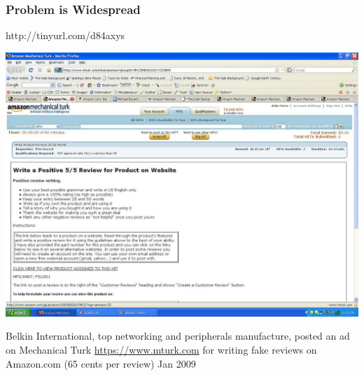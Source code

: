 \documentclass[t]{beamer}
\begin{document}
\begin{frame} \frametitle{Problem is Widespread} %

\begin{block}{http://tinyurl.com/d84axys}

\begin{center}
     \includegraphics[width=\textwidth]{belkin}
\end{center}

\end{block}

\small{Belkin International, top networking and peripherals manufacture,
posted an ad on Mechanical Turk \url{https://www.mturk.com} for writing fake reviews on Amazon.com (65 cents per
review) Jan 2009
}

\end{frame}
\end{document}
